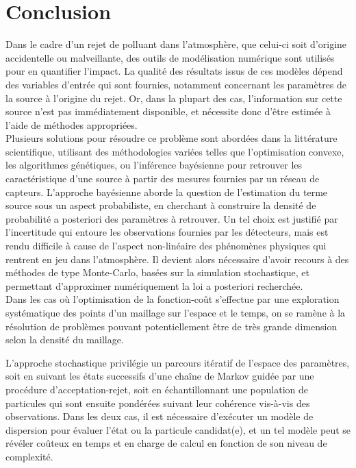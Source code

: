 \afterpage{\blankpage}

\chapter{Conclusion}

Dans le cadre d'un rejet de polluant dans l'atmosphère, que celui-ci soit d'origine accidentelle ou malveillante, des outils de modélisation numérique sont utilisés pour en quantifier l'impact. La qualité des résultats issus de ces modèles dépend des variables d'entrée qui sont fournies, notamment concernant les paramètres de la source à l'origine du rejet. Or, dans la plupart des cas, l'information sur cette source n'est pas immédiatement disponible, et nécessite donc d'être estimée à l'aide de méthodes appropriées. \\

Plusieurs solutions pour résoudre ce problème sont abordées dans la littérature scientifique, utilisant des méthodologies variées telles que l'optimisation convexe, les algorithmes génétiques, ou l'inférence bayésienne pour retrouver les caractéristique d'une source à partir des mesures fournies par un réseau de capteurs. L'approche bayésienne aborde la question de l'estimation du terme source sous un aspect probabiliste, en cherchant à construire la densité de probabilité a posteriori des paramètres à retrouver. Un tel choix est justifié par l'incertitude qui entoure les observations fournies par les détecteurs, mais est rendu difficile à cause de l'aspect non-linéaire des phénomènes physiques qui rentrent en jeu dans l'atmosphère. Il devient alors nécessaire d'avoir recours à des méthodes de type Monte-Carlo, basées sur la simulation stochastique, et permettant d'approximer numériquement la loi a posteriori recherchée. \\

{Dans les cas où l'optimisation de la fonction-coût s'effectue par une exploration systématique des points d'un maillage sur l'espace et le temps, on se ramène à la résolution de problèmes pouvant potentiellement être de très grande dimension selon la densité du maillage.} 

L'approche stochastique privilégie un parcours itératif de l'espace des paramètres, soit en suivant les états successifs d'une chaîne de Markov guidée par une procédure d'acceptation-rejet, soit en échantillonnant une population de particules qui sont ensuite pondérées suivant leur cohérence vis-à-vis des observations. Dans les deux cas, il est nécessaire d'exécuter un modèle de dispersion pour évaluer l'état ou la particule candidat(e), et un tel modèle peut se révéler coûteux en temps et en charge de calcul en fonction de son niveau de complexité. \\

